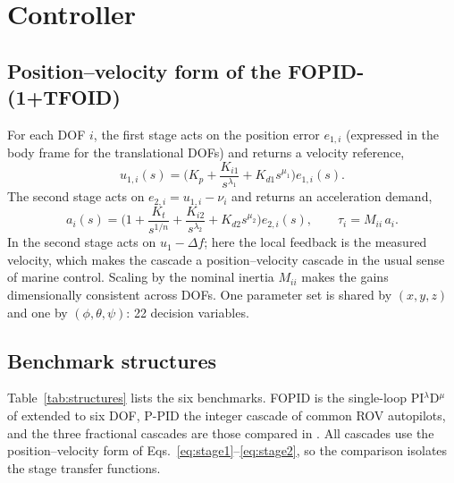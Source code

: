\documentclass[review,12pt]{elsarticle}
\begin{document}
\section{Controller}\label{sec:controller}

\subsection{Position--velocity form of the FOPID-(1+TFOID)}
For each DOF $i$, the first stage acts on the position error $e_{1,i}$ (expressed in the body frame for
the translational DOFs) and returns a velocity reference,
\begin{equation}\label{eq:stage1}
  u_{1,i}(s) = \Big(K_p + \frac{K_{i1}}{s^{\lambda_1}} + K_{d1}s^{\mu_1}\Big) e_{1,i}(s).
\end{equation}
The second stage acts on $e_{2,i}=u_{1,i}-\nu_i$ and returns an acceleration demand,
\begin{equation}\label{eq:stage2}
  a_i(s) = \Big(1 + \frac{K_t}{s^{1/n}} + \frac{K_{i2}}{s^{\lambda_2}} + K_{d2}s^{\mu_2}\Big) e_{2,i}(s),
  \qquad \tau_i = M_{ii}\, a_i .
\end{equation}
In \cite{nour2026scirep} the second stage acts on $u_1-\Delta f$; here the local feedback is the measured
velocity, which makes the cascade a position--velocity cascade in the usual sense of marine control.
Scaling by the nominal inertia $M_{ii}$ makes the gains dimensionally consistent across DOFs. One parameter
set is shared by $(x,y,z)$ and one by $(\phi,\theta,\psi)$: 22 decision variables.

\subsection{Benchmark structures}
Table~\ref{tab:structures} lists the six benchmarks. FOPID is the single-loop PI$^\lambda$D$^\mu$ of
\cite{ersoy2026jestech} extended to six DOF, P-PID the integer cascade of common ROV autopilots, and the
three fractional cascades are those compared in \cite{nour2026scirep}. All cascades use the
position--velocity form of Eqs.~\eqref{eq:stage1}--\eqref{eq:stage2}, so the comparison isolates the stage
transfer functions.
\end{document}
